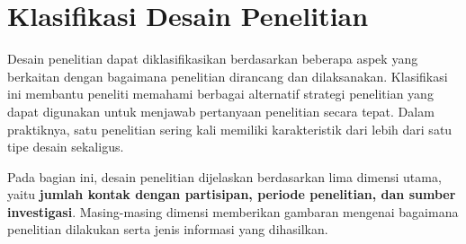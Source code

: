 \documentclass[
  indonesian,
  letterpaper,
  DIV=11,
  numbers=noendperiod]{scrreprt}
\begin{document}
\section{Klasifikasi Desain
Penelitian}\label{klasifikasi-desain-penelitian}

Desain penelitian dapat diklasifikasikan berdasarkan beberapa aspek yang
berkaitan dengan bagaimana penelitian dirancang dan dilaksanakan.
Klasifikasi ini membantu peneliti memahami berbagai alternatif strategi
penelitian yang dapat digunakan untuk menjawab pertanyaan penelitian
secara tepat. Dalam praktiknya, satu penelitian sering kali memiliki
karakteristik dari lebih dari satu tipe desain sekaligus.

Pada bagian ini, desain penelitian dijelaskan berdasarkan lima dimensi
utama, yaitu \textbf{jumlah kontak dengan partisipan, periode
penelitian, dan sumber investigasi}. Masing-masing dimensi memberikan
gambaran mengenai bagaimana penelitian dilakukan serta jenis informasi
yang dihasilkan.
\end{document}
